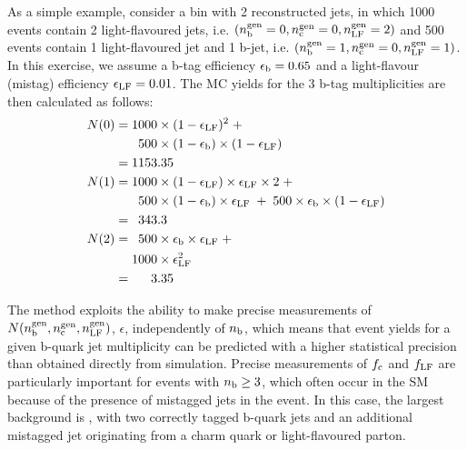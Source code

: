As a simple example, consider a bin with 2 reconstructed jets, in
which 1000 events contain 2 light-flavoured jets, i.e. $(n_{\rm
  b}^{\rm gen} = 0,n_{\rm c}^{\rm gen} = 0,n_{\rm LF}^{\rm gen} = 2)$
and 500 events contain 1 light-flavoured jet and 1 b-jet,
i.e. $(n_{\rm b}^{\rm gen} = 1,n_{\rm c}^{\rm gen} = 0,n_{\rm LF}^{\rm
  gen} = 1)$.  In this exercise, we assume a b-tag efficiency
$\epsilon_{\rm b} = 0.65$ and a light-flavour (mistag) efficiency
$\epsilon_{\rm LF} = 0.01$.  The MC yields for the 3 b-tag
multiplicities are then calculated as follows:
\begin{align*}
N(0) = & \; 1000\times (1-\epsilon_{\rm LF})^2 \;+                                \\
       & \; \phantom{1}500\times(1-\epsilon_{\rm b})\times(1-\epsilon_{\rm LF})   \\
     = & \; 1153.35                                                               \\
N(1) = & \; 1000\times (1-\epsilon_{\rm LF})\times \epsilon_{\rm LF} \times 2 \;+ \\
       & \; \phantom{1}500\times (1-\epsilon_{\rm b})\times\epsilon_{\rm LF} \;+\;  
       500\times \epsilon_{\rm b} \times (1-\epsilon_{\rm LF})                    \\
     = & \; \phantom{1}343.3                                                      \\
N(2) = & \; \phantom{1}500\times \epsilon_{\rm b} \times \epsilon_{\rm LF} \;+    \\
       & \; 1000\times \epsilon_{\rm LF}^2                                        \\
     = & \; \phantom{100}3.35                                                     \\
\end{align*}
  
The method exploits the ability to make precise measurements of
$N(n_{\rm b}^{\rm gen},n_{\rm c}^{\rm gen},n_{\rm LF}^{\rm gen})$,
$\epsilon$,  independently of $n_{\rm b}$,
which means that event yields for a given b-quark jet multiplicity can
be predicted with a higher statistical precision than obtained
directly from simulation. Precise measurements of $f_{\rm c}$ and
$f_{\rm LF}$ are particularly important for events with $n_{\rm b} \geq
3$, which often occur in the SM because of the presence of mistagged
jets in the event. In this case, the largest background is \ttbar,
with two correctly tagged b-quark jets and an additional mistagged jet
originating from a charm quark or light-flavoured parton.

